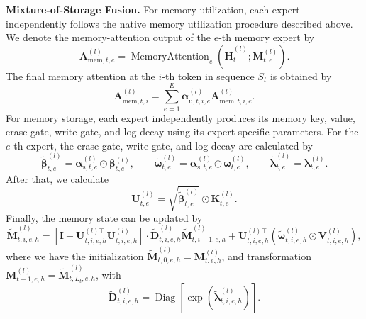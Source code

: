 \textbf{Mixture-of-Storage Fusion.}
For memory utilization, each expert independently follows the native memory utilization procedure described above.
We denote the memory-attention output of the $e$-th memory expert by
\begin{equation*}
    \mathbf{A}_{\mathrm{mem},t,e}^{(l)}
    =
    \operatorname{MemoryAttention}_{e}
    \left(
    \tilde{\mathbf{H}}_{t}^{(l)};
    \mathbf{M}_{t,e}^{(l)}
    \right).
\end{equation*}
The final memory attention at the $i$-th token in sequence $S_t$ is obtained by
\begin{equation*}
    \mathbf{A}_{\mathrm{mem},t,i}^{(l)}
    =
    \sum_{e=1}^{E}
    \bm{\alpha}_{\text{u},t,i,e}^{(l)}
    \mathbf{A}_{\mathrm{mem},t,i,e}^{(l)}.
\end{equation*}
For memory storage, each expert independently produces its memory key, value, erase gate, write gate, and log-decay using its expert-specific parameters.
For the $e$-th expert, the erase gate, write gate, and log-decay are calculated by
\begin{equation*}
    \tilde{\bm{\beta}}_{t,e}^{(l)}
    =
    \bm{\alpha}_{\text{s},t,e}^{(l)}
    \odot
    \bm{\beta}_{t,e}^{(l)},
    \qquad
    \tilde{\bm{\omega}}_{t,e}^{(l)}
    =
    \bm{\alpha}_{\text{s},t,e}^{(l)}
    \odot
    \bm{\omega}_{t,e}^{(l)},
    \qquad
    \tilde{\bm{\lambda}}_{t,e}^{(l)}
    =
    \bm{\lambda}_{t,e}^{(l)}.
\end{equation*}
After that, we calculate
\begin{equation*}
    \mathbf{U}_{t,e}^{(l)} = \sqrt{\tilde{\bm{\beta}}_{t,e}^{(l)}}
\odot
\mathbf{K}_{t,e}^{(l)}.
\end{equation*}
Finally, the memory state can be updated by
\begin{equation*}
    \tilde{\mathbf{M}}_{t,i,e,h}^{(l)} = \left[
\mathbf{I}
-
\mathbf{U}_{t,i,e,h}^{(l)\top}
\mathbf{U}_{t,i,e,h}^{(l)}
\right]
\cdot
\tilde{\mathbf{D}}_{t,i,e,h}^{(l)}
\tilde{\mathbf{M}}_{t,i-1,e,h}^{(l)}
+
\mathbf{U}_{t,i,e,h}^{(l)\top}
\left(
\tilde{\bm{\omega}}_{t,i,e,h}^{(l)}
\odot
\mathbf{V}_{t,i,e,h}^{(l)}
\right),
\end{equation*}
where we have the initialization $\tilde{\mathbf{M}}_{t, 0, e, h}^{(l)} = \mathbf{M}_{t, e, h}^{(l)}$, and transformation $\mathbf{M}_{t+1, e, h}^{(l)} = \tilde{\mathbf{M}}_{t, L_t, e, h}^{(l)}$, with
\begin{equation*}
    \tilde{\mathbf{D}}_{t,i,e,h}^{(l)} = \operatorname{Diag}
\left[
\exp
\left(
\tilde{\bm{\lambda}}_{t,i,e,h}^{(l)}
\right)
\right].
\end{equation*}


